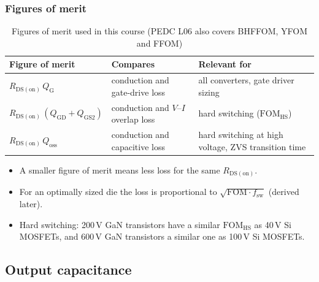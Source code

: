 \begin{frame}
	\frametitle{Figures of merit}
	\begin{table}
		\centering
		\small
		\begin{tabular}{|l|>{\raggedright\arraybackslash}p{4.3cm}|>{\raggedright\arraybackslash}p{4.6cm}|}
			\hline
			\textbf{Figure of merit}                                 & \textbf{Compares}                       & \textbf{Relevant for}                                  \\
			\hline
			$R_\mathrm{DS(on)}\,Q_\mathrm{G}$                        & conduction and gate-drive loss          & all converters, gate driver sizing                     \\
			$R_\mathrm{DS(on)}\,(Q_\mathrm{GD}+Q_\mathrm{GS2})$      & conduction and $V$--$I$ overlap loss    & hard switching ($\mathrm{FOM_{HS}}$)                   \\
			$R_\mathrm{DS(on)}\,Q_\mathrm{oss}$                      & conduction and capacitive loss          & hard switching at high voltage, ZVS transition time    \\
			\hline
		\end{tabular}
		\caption{Figures of merit used in this course (PEDC L06 also covers BHFFOM, YFOM and FFOM)}
	\end{table}
	\begin{itemize}
		\item A smaller figure of merit means less loss for the same $R_\mathrm{DS(on)}$.
		\item For an optimally sized die the loss is proportional to $\sqrt{\mathrm{FOM}\cdot f_\mathrm{sw}}$ (derived later).
		\item Hard switching: 200\,V GaN transistors have a similar $\mathrm{FOM_{HS}}$ as 40\,V Si MOSFETs, and 600\,V GaN transistors a similar one as 100\,V Si MOSFETs.
	\end{itemize}
\end{frame}

\subsection{Output capacitance}


